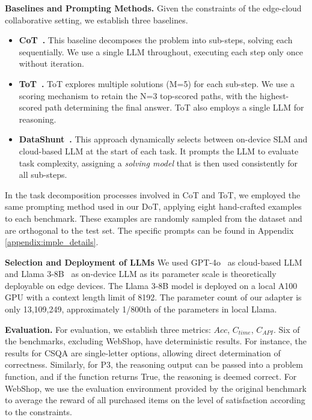 \textbf{Baselines and Prompting Methods.} 
Given the constraints of the edge-cloud collaborative setting, we establish three baselines.

\begin{itemize}
    \item \textbf{CoT~\cite{wei2022chain}.} This baseline decomposes the problem into sub-steps, solving each sequentially. We use a single LLM throughout, executing each step only once without iteration.
    \item \textbf{ToT~\cite{yao2023tree}.} ToT explores multiple solutions (M=5) for each sub-step. We use a scoring mechanism to retain the N=3 top-scored paths, with the highest-scored path determining the final answer. ToT also employs a single LLM for reasoning.
    \item \textbf{DataShunt~\cite{chen2024data}.} This approach dynamically selects between on-device SLM and cloud-based LLM at the start of each task. It prompts the LLM to evaluate task complexity, assigning a \textit{solving model} that is then used consistently for all sub-steps.
\end{itemize}
In the task decomposition processes involved in CoT and ToT, we employed the same prompting method used in our DoT, applying eight hand-crafted examples to each benchmark. These examples are randomly sampled from the dataset and are orthogonal to the test set. The specific prompts can be found in Appendix \ref{appendix:imple_details}.


\textbf{Selection and Deployment of LLMs}
We used GPT-4o~\cite{GPT-4o} as cloud-based LLM and Llama 3-8B~\cite{LLaMA3} as on-device LLM as its parameter scale is theoretically deployable on edge devices.
The Llama 3-8B model is deployed on a local A100 GPU with a context length limit of 8192. The parameter count of our adapter is only 13,109,249, approximately 1/800th of the parameters in local Llama.

\textbf{Evaluation.} 
For evaluation, we establish three metrics: $Acc$, $C_{time}$, $C_{API}$. Six of the benchmarks, excluding WebShop, have deterministic results. For instance, the results for CSQA are single-letter options, allowing direct determination of correctness. Similarly, for P3, the reasoning output can be passed into a problem function, and if the function returns True, the reasoning is deemed correct.
For WebShop, we use the evaluation environment provided by the original benchmark to average the reward of all purchased items on the level of satisfaction according to the constraints.

